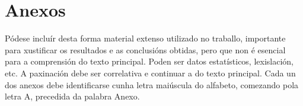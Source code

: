 \section{Anexos}
Pódese incluír desta forma material extenso utilizado no traballo, importante para xustificar os resultados e as conclusións obtidas, pero que non é esencial para a comprensión do texto principal. Poden ser datos estatísticos, lexislación, etc.
A paxinación debe ser correlativa e continuar a do texto principal. Cada un dos anexos debe identificarse cunha letra maiúscula do alfabeto, comezando pola letra A, precedida da palabra Anexo.
